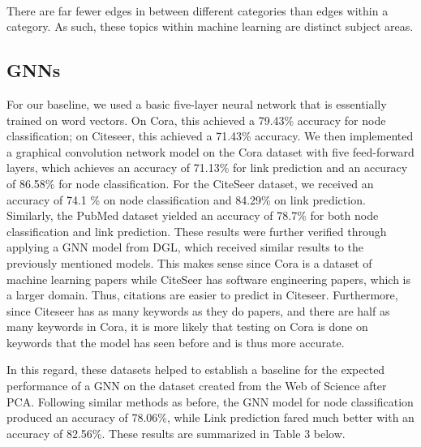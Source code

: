 \documentclass[conference]{IEEEtran}
\begin{document}
\ \newline
\ \newline

There are far fewer edges in between different categories than edges within a category. 
As such, these topics within machine learning are distinct subject areas. \par

\subsection{GNNs}

For our baseline, we used a basic five-layer neural network that is essentially trained on word 
vectors. On Cora, this achieved a 79.43\% accuracy for node classification; 
on Citeseer, this achieved a 71.43\% accuracy. We then implemented a graphical 
convolution network model on the Cora dataset with five feed-forward layers, which 
achieves an accuracy of 71.13\% for link prediction and an accuracy of  86.58\% for 
node classification. For the CiteSeer dataset, we received an accuracy of 74.1
\% on node classification and 84.29\% on link prediction. Similarly, the PubMed dataset 
yielded an accuracy of 78.7\% for both node classification and link prediction. 
These results were further verified through applying a GNN model from DGL, which received 
similar results to the previously mentioned models. This makes sense since Cora is a dataset 
of machine learning papers while CiteSeer has software engineering papers, which is a larger 
domain. Thus, citations are easier to predict in Citeseer. Furthermore, since Citeseer 
has as many keywords as they do papers, and there are half as many keywords in Cora, 
it is more likely that testing on Cora is done on keywords that the model has seen 
before and is thus more accurate. \par

In this regard, these datasets helped to establish a baseline for the expected performance 
of a GNN on the dataset created from the Web of Science after PCA. Following similar methods as 
before, the GNN model for node classification produced an accuracy of 78.06\%, 
while Link prediction fared much better with an accuracy of 82.56\%. 
These results are summarized in Table 3 below. \par 
\end{document}
